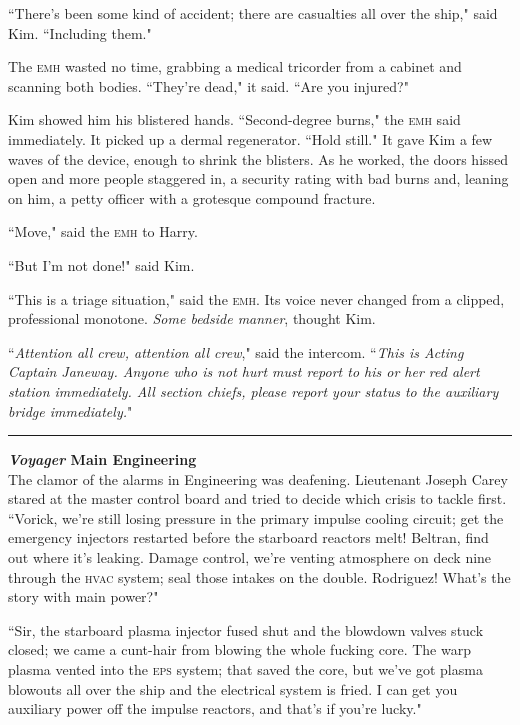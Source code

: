 \documentclass[twoside,letterpaper,12pt]{memoir}
\begin{document}
``There's been some kind of accident; there are casualties all over the ship," said Kim. ``Including them."

The \textsc{emh} wasted no time, grabbing a medical tricorder from a cabinet and scanning both bodies. ``They're dead," it said. ``Are you injured?"

Kim showed him his blistered hands. ``Second-degree burns," the \textsc{emh} said immediately. It picked up a dermal regenerator. ``Hold still." It gave Kim a few waves of the device, enough to shrink the blisters. As he worked, the doors hissed open and more people staggered in, a security rating with bad burns and, leaning on him, a petty officer with a grotesque compound fracture.

``Move," said the \textsc{emh} to Harry.

``But I'm not done!" said Kim.

``This is a triage situation," said the \textsc{emh}. Its voice never changed from a clipped, professional monotone. \textit{Some bedside manner}, thought Kim.

``\textit{Attention all crew, attention all crew}," said the intercom. ``\textit{This is Acting Captain Janeway. Anyone who is not hurt must report to his or her red alert station immediately. All section chiefs, please report your status to the auxiliary bridge immediately.}"

\begin{center}\rule{3cm}{0.4 pt}\end{center}

\noindent\textbf{\textit{Voyager} Main Engineering}\\

The clamor of the alarms in Engineering was deafening. Lieutenant Joseph Carey stared at the master control board and tried to decide which crisis to tackle first. ``Vorick, we're still losing pressure in the primary impulse cooling circuit; get the emergency injectors restarted before the starboard reactors melt! Beltran, find out where it's leaking. Damage control, we're venting atmosphere on deck nine through the \textsc{hvac} system; seal those intakes on the double. Rodriguez! What's the story with main power?"

``Sir, the starboard plasma injector fused shut and the blowdown valves stuck closed; we came a cunt-hair from blowing the whole fucking core. The warp plasma vented into the \textsc{eps} system; that saved the core, but we've got plasma blowouts all over the ship and the electrical system is fried. I can get you auxiliary power off the impulse reactors, and that's if you're lucky."
\end{document}
